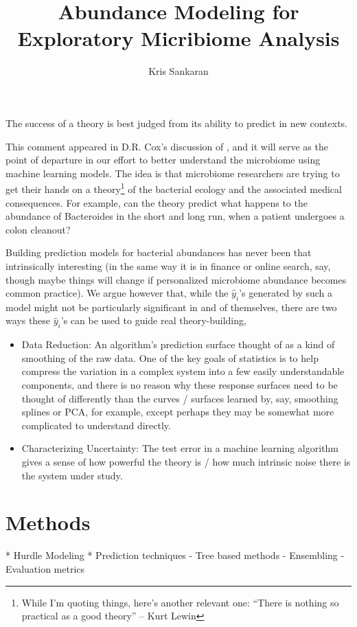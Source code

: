 \documentclass{article}
\title{Abundance Modeling for Exploratory Micribiome Analysis}
\author{Kris Sankaran}
\begin{document}
\maketitle

\begin{displayquote}
The success of a theory is best judged from its ability to predict
  in new contexts.
\end{displayquote}

This comment appeared in D.R. Cox's discussion of \cite{breiman2001statistical},
and it will serve as the point of departure in our effort to better understand
the microbiome using machine learning models. The idea is that microbiome
researchers are trying to get their hands on a theory\footnote{While I'm quoting
  things, here's another relevant one: ``There is nothing so practical as a good
  theory'' -- Kurt Lewin} of the bacterial ecology and the associated medical
consequences. For example, can the theory predict what happens to the abundance
of Bacteroides in the short and long run, when a patient undergoes a colon
cleanout?

Building prediction models for bacterial abundances has never been that
intrinsically interesting (in the same way it is in finance or online search,
say, though maybe things will change if personalized microbiome abundance
becomes common practice). We argue however that, while the $\hat{y}_{i}$'s
generated by such a model might not be particularly significant in and of
themselves, there are two ways these $\hat{y}_{i}$'s can be used to guide real
theory-building,

\begin{itemize}
\item Data Reduction: An algorithm's prediction surface thought of as a kind of
  smoothing of the raw data. One of the key goals of statistics is to help
  compress the variation in a complex system into a few easily understandable
  components, and there is no reason why these response surfaces need to be
  thought of differently than the curves / surfaces learned by, say, smoothing
  splines or PCA, for example, except perhaps they may be somewhat more
  complicated to understand directly.
\item Characterizing Uncertainty: The test error in a machine learning algorithm
  gives a sense of how powerful the theory is / how much intrinsic noise there
  is the system under study.
\end{itemize}

\section{Methods}
* Hurdle Modeling
* Prediction techniques
- Tree based methods
- Ensembling
- Evaluation metrics
\end{document}
